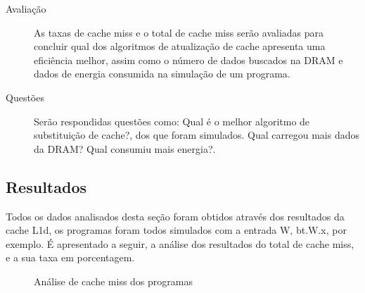 \documentclass[12pt]{article}
\begin{document}
\begin{description}
\item[Avaliação] As taxas de cache miss e o total de cache miss serão avaliadas para concluir qual dos algoritmos de atualização de cache apresenta uma eficiência melhor, assim como o número de dados buscados na DRAM e dados de energia consumida na simulação de um programa. 

\item[Questões] Serão respondidas questões como: Qual é o melhor algoritmo de substituição de cache?, dos que foram simulados. Qual carregou mais dados da DRAM? Qual consumiu mais energia?.
\end{description}

\subsection{Resultados}

Todos os dados analisados desta seção foram obtidos através dos resultados da cache L1d, os programas foram todos simulados com a entrada W, bt.W.x, por exemplo. É apresentado a seguir, a análise dos resultados do total de cache miss, e a sua taxa em porcentagem. 

\begin{figure}[!h]
\centering
{}
\caption{Análise de cache miss dos programas}
\label{fig:fig1}
\end{figure}
\end{document}
